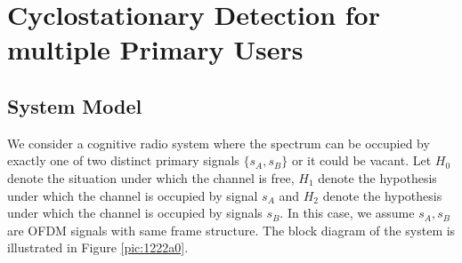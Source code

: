 \section{Cyclostationary Detection for multiple Primary Users}
\subsection{System Model}

We consider a cognitive radio system where the spectrum can be occupied by exactly one of two distinct primary signals $\{s_A, s_B\}$ or it could be vacant. Let $H_0$ denote the situation under which the channel is free, $H_1$ denote the hypothesis under which the channel is occupied by signal $s_A$ and $H_2$ denote the hypothesis under which the channel is occupied by signals $s_B$. In this case, we assume $s_A, s_B$ are OFDM signals with same frame structure. The block diagram of the system is illustrated in Figure \ref{pic:1222a0}.

